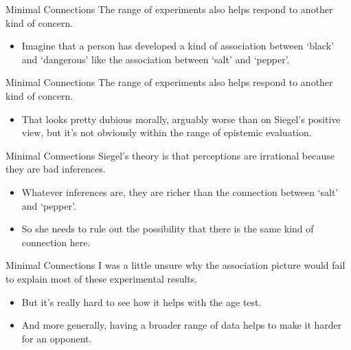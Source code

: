 \documentclass[
  17pt,
  letterpaper,
  ignorenonframetext,
  aspectratio=169,
  xcolor={dvipsnames}]{beamer}
\providecommand{\tightlist}{%
  \setlength{\itemsep}{0pt}\setlength{\parskip}{0pt}}\usepackage{longtable,booktabs,array}
\begin{document}
\begin{frame}{Minimal Connections}
\protect\hypertarget{minimal-connections}{}
The range of experiments also helps respond to another kind of concern.

\begin{itemize}[<+->]
\tightlist
\item
  Imagine that a person has developed a kind of association between
  `black' and `dangerous' like the association between `salt' and
  `pepper'.
\end{itemize}
\end{frame}

\begin{frame}{Minimal Connections}
\protect\hypertarget{minimal-connections-1}{}
The range of experiments also helps respond to another kind of concern.

\begin{itemize}[<+->]
\tightlist
\item
  That looks pretty dubious morally, arguably worse than on Siegel's
  positive view, but it's not obviously within the range of epistemic
  evaluation.
\end{itemize}
\end{frame}

\begin{frame}{Minimal Connections}
\protect\hypertarget{minimal-connections-2}{}
Siegel's theory is that perceptions are irrational because they are bad
inferences.

\begin{itemize}[<+->]
\tightlist
\item
  Whatever inferences are, they are richer than the connection between
  `salt' and `pepper'.
\item
  So she needs to rule out the possibility that there is the same kind
  of connection here.
\end{itemize}
\end{frame}

\begin{frame}{Minimal Connections}
\protect\hypertarget{minimal-connections-3}{}
I was a little unsure why the association picture would fail to explain
most of these experimental results.

\begin{itemize}[<+->]
\tightlist
\item
  But it's really hard to see how it helps with the age test.
\item
  And more generally, having a broader range of data helps to make it
  harder for an opponent.
\end{itemize}
\end{frame}
\end{document}
